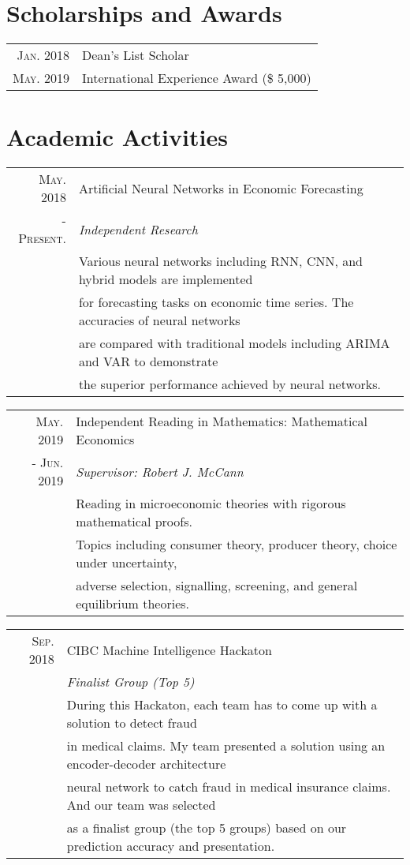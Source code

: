 \documentclass[a4paper,10pt]{article}
\begin{document}
\section{Scholarships and Awards}
\begin{tabular}{rl}
    \textsc{Jan.} 2018 & Dean's List Scholar\\
    \textsc{May.} 2019 & International Experience Award (\$ 5,000)\\
\end{tabular}

\section{Academic Activities}
\begin{tabular}{rl}
	\textsc{May.} 2018 & Artificial Neural Networks in Economic Forecasting \\
	- \textsc{Present.} & \emph{Independent Research} \\
	& \quad Various neural networks including RNN, CNN, and hybrid models are implemented \\
	& for forecasting tasks on economic time series. The accuracies of neural networks \\
	& are compared with traditional models including ARIMA and VAR to
	demonstrate \\
	& the superior performance achieved by neural networks.
\end{tabular}

\begin{tabular}{rl}
	\textsc{May.} 2019 & Independent Reading in Mathematics: Mathematical Economics \\
	- \textsc{Jun.} 2019 & \emph{Supervisor: Robert J. McCann} \\
	& \quad Reading in microeconomic theories with rigorous mathematical proofs. \\
	& Topics including consumer theory, producer theory, choice under uncertainty, \\
	& adverse selection, signalling, screening, and general equilibrium theories.
\end{tabular}

\begin{tabular}{rl}
    \textsc{Sep.} 2018 & CIBC Machine Intelligence Hackaton \\
    & \emph{Finalist Group (Top 5)} \\
    & \quad During this Hackaton, each team has to come up with a solution to detect fraud \\ 
    & in medical claims. My team presented a solution using an encoder-decoder architecture \\
    & neural network to catch fraud in medical insurance claims. And our team was selected \\ 
    & as a finalist group (the top 5 groups) based on our prediction accuracy and presentation.
\end{tabular}
\end{document}
